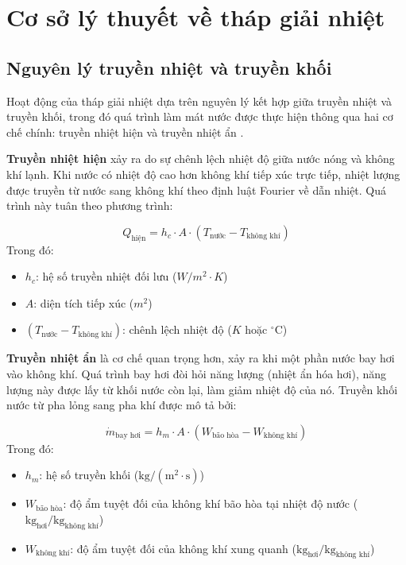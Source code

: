 \documentclass[../main.tex]{subfiles}
\begin{document}
\section{Cơ sở lý thuyết về tháp giải nhiệt}
\label{sec:cooling_tower_theory}

\subsection{Nguyên lý truyền nhiệt và truyền khối}
\label{sec:heat_mass_transfer_principle}

Hoạt động của tháp giải nhiệt dựa trên nguyên lý kết hợp giữa truyền nhiệt và truyền khối, trong đó quá trình làm mát nước được thực hiện thông qua hai cơ chế chính: truyền nhiệt hiện và truyền nhiệt ẩn \cite{ashrae2020cooling}.

\textbf{Truyền nhiệt hiện} xảy ra do sự chênh lệch nhiệt độ giữa nước nóng và không khí lạnh. Khi nước có nhiệt độ cao hơn không khí tiếp xúc trực tiếp, nhiệt lượng được truyền từ nước sang không khí theo định luật Fourier về dẫn nhiệt. Quá trình này tuân theo phương trình:

\begin{equation}
    Q_{\text{hiện}} = h_c \cdot A \cdot (T_{\text{nước}} - T_{\text{không khí}})
\end{equation}
Trong đó:
\begin{itemize}
    \item $h_c$: hệ số truyền nhiệt đối lưu ($W/m^2\cdot K$)
    \item $A$: diện tích tiếp xúc ($m^2$)
    \item $\left(T_{\text{nước}} - T_{\text{không khí}}\right)$: chênh lệch nhiệt độ ($K$ hoặc $^\circ\mathrm{C}$)
\end{itemize}

\textbf{Truyền nhiệt ẩn} là cơ chế quan trọng hơn, xảy ra khi một phần nước bay hơi vào không khí. Quá trình bay hơi đòi hỏi năng lượng (nhiệt ẩn hóa hơi), năng lượng này được lấy từ khối nước còn lại, làm giảm nhiệt độ của nó. Truyền khối nước từ pha lỏng sang pha khí được mô tả bởi:

\begin{equation}
    \dot{m}_{\text{bay hơi}} = h_m \cdot A \cdot (W_{\text{bão hòa}} - W_{\text{không khí}})
\end{equation}
Trong đó:
\begin{itemize}
    \item $h_m$: hệ số truyền khối ($\mathrm{kg}/(\mathrm{m}^2 \cdot \mathrm{s})$)
    \item $W_{\text{bão hòa}}$: độ ẩm tuyệt đối của không khí bão hòa tại nhiệt độ nước ($\mathrm{kg}_{\text{hơi}}/\mathrm{kg}_{\text{không~khí}}$)
    \item $W_{\text{không khí}}$: độ ẩm tuyệt đối của không khí xung quanh ($\mathrm{kg}_{\text{hơi}}/\mathrm{kg}_{\text{không~khí}}$)
\end{itemize}
\end{document}
